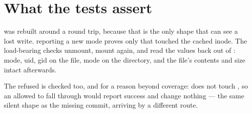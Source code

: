 \section{What the tests assert}

 was rebuilt around a round trip, because that is the only
shape that can see a lost write.  reporting a new mode proves only
that  touched the cached inode. The load-bearing checks
unmount, mount again, and read the values back out of : mode, uid,
gid on the file, mode on the directory, and the file's contents and size intact
afterwards.

The refused  is checked too, and for a reason beyond coverage:
 does not touch , so an 
allowed to fall through would report success and change nothing --- the same
silent shape as the missing commit, arriving by a different route.

